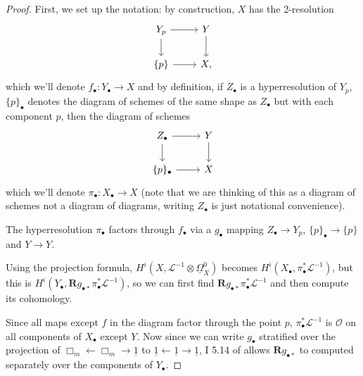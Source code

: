 \documentclass[proquest]{uwthesis}[2014/11/13]
\theoremstyle{definition}
\newcommand{\LL}{\mathcal{L}}
\newcommand{\OO}{\mathcal{O}}
\newcommand{\bR}{\textbf{R}}
\newcommand{\DB}{\underline{\Omega}}
\begin{document}
\begin{proof}
	First, we set up the notation: by construction, $X$ has the 2-resolution
	\[
	\begin{tikzcd}
	Y_p \ar{r} \ar{d} & Y \ar{d} \\
	\{p\} \ar{r} & X,
	\end{tikzcd}\]
	which we'll denote $f_\bullet : Y_\bullet \rightarrow X$
	and by definition, if $Z_\bullet$ is a hyperresolution of $Y_p$, $\{p\}_\bullet$ denotes the diagram of schemes of the same shape as $Z_\bullet$ but with each component $p$, then the diagram of schemes
	\[
	\begin{tikzcd}
	Z_\bullet \ar{r} \ar{d} & Y \ar{d} \\
	\{p\}_\bullet \ar{r} & X
	\end{tikzcd}\]
	which we'll denote $\pi_\bullet : X_\bullet \rightarrow X$ (note that we are thinking of this as a diagram of schemes not a diagram of diagrams, writing $Z_\bullet$ is just notational convenience).
		
	The hyperresolution $\pi_\bullet$ factors through $f_\bullet$ via a $g_\bullet$ mapping $Z_\bullet \rightarrow Y_p$, $\{p\}_\bullet \rightarrow \{p\}$ and $Y \rightarrow Y$.
		
	Using the projection formula, $H^i(X, \LL^{-1} \otimes \DB_{X}^0)$ becomes $H^i(X_\bullet, \pi_\bullet^* \LL^{-1})$, but this is $H^i(Y_\bullet, \bR g_{\bullet *} \pi_\bullet^* \LL^{-1})$, so we can first find $\bR g_{\bullet *} \pi_\bullet^* \LL^{-1}$ and then compute its cohomology.
		
	Since all maps except $f$ in the diagram factor through the point $p$, $\pi_\bullet^* \LL^{-1}$ is $\OO$ on all components of $X_\bullet$ except $Y$.
	Now since we can write $g_\bullet$ stratified over the projection of $\Box_m \leftarrow \Box_m \rightarrow \underline{1}$ to $\underline{1} \leftarrow \underline{1} \rightarrow \underline{1}$, I 5.14 of \cite{Guillen1988} allows $\bR g_{\bullet *}$ to computed separately over the components of $Y_\bullet$.
		

\end{proof}
\end{document}
